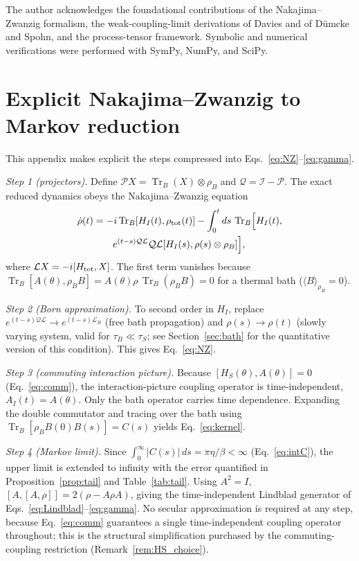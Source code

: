 \documentclass[aps,pra,reprint,superscriptaddress,nofootinbib,longbibliography]{revtex4-2}
\newcommand{\tr}{\operatorname{Tr}}
\begin{document}
\begin{acknowledgments}
The author acknowledges the foundational contributions of the
Nakajima--Zwanzig formalism, the weak-coupling-limit derivations of
Davies and of D\"umcke and Spohn, and the process-tensor framework.
Symbolic and numerical verifications were performed with SymPy,
NumPy, and SciPy.
\end{acknowledgments}

\appendix

\section{Explicit Nakajima--Zwanzig to Markov reduction}
\label{app:NZ}

This appendix makes explicit the steps compressed into
Eqs.~\eqref{eq:NZ}--\eqref{eq:gamma}.

\emph{Step 1 (projectors).} Define $\mathcal{P}X=\tr_B(X)\otimes\rho_B$
and $\mathcal{Q}=\mathcal{I}-\mathcal{P}$. The exact reduced dynamics
obeys the Nakajima--Zwanzig equation
\begin{align}
\dot\rho(t) &= -i\tr_B[H_I(t),\rho_{\rm tot}(t)]
-\int_0^t ds\,\tr_B\Bigl[H_I(t),\notag\\
&\qquad
e^{(t-s)\mathcal{QL}}\mathcal{QL}[H_I(s),\rho(s)\otimes\rho_B]\Bigr],
\end{align}
where $\mathcal{L}X=-i[H_{\rm tot},X]$. The first term vanishes
because $\tr_B[A(\theta),\rho_B B]=A(\theta)\rho\,\tr_B(\rho_B B)=0$
for a thermal bath ($\langle B\rangle_{\rho_B}=0$).

\emph{Step 2 (Born approximation).} To second order in $H_I$, replace
$e^{(t-s)\mathcal{QL}}\to e^{(t-s)\mathcal{L}_B}$ (free bath
propagation) and $\rho(s)\to\rho(t)$ (slowly varying system, valid for
$\tau_B\ll\tau_S$; see Section~\ref{sec:bath} for the quantitative
version of this condition). This gives Eq.~\eqref{eq:NZ}.

\emph{Step 3 (commuting interaction picture).} Because
$[H_S(\theta),A(\theta)]=0$ (Eq.~\eqref{eq:comm}), the
interaction-picture coupling operator is time-independent,
$A_I(t)=A(\theta)$. Only the bath operator carries time dependence.
Expanding the double commutator and tracing over the bath using
$\tr_B[\rho_B B(0)B(s)]=C(s)$ yields Eq.~\eqref{eq:kernel}.

\emph{Step 4 (Markov limit).} Since
$\int_0^\infty|C(s)|\,ds=\pi\eta/\beta<\infty$ (Eq.~\eqref{eq:intC}),
the upper limit is extended to infinity with the error quantified in
Proposition~\ref{prop:tail} and Table~\ref{tab:tail}. Using $A^2=I$,
$[A,[A,\rho]]=2(\rho-A\rho A)$, giving the time-independent Lindblad
generator of Eqs.~\eqref{eq:Lindblad}--\eqref{eq:gamma}. No secular
approximation is required at any step, because Eq.~\eqref{eq:comm}
guarantees a single time-independent coupling operator throughout;
this is the structural simplification purchased by the
commuting-coupling restriction (Remark~\ref{rem:HS_choice}).
\end{document}
